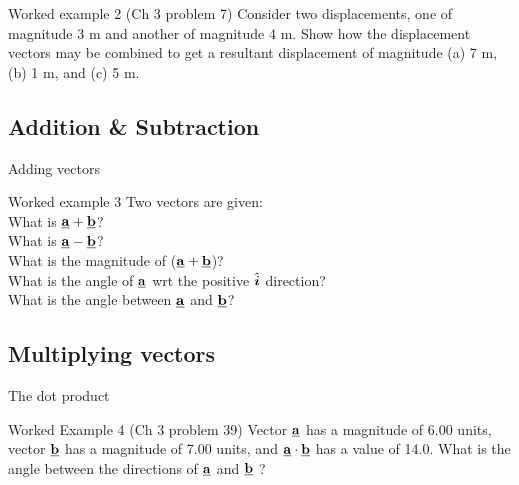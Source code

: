 \begin{frame}{Worked example 2 (Ch 3 problem 7)}
\small
 Consider two displacements, one of magnitude 3 m and another of magnitude 4 m. Show how the displacement vectors may be combined to get a resultant displacement of magnitude (a) 7 m, (b) 1 m, and (c) 5 m.\\[20ex]

\end{frame}



 \subsection{Addition \& Subtraction} %
 
 
\begin{frame}{Adding vectors}
\small

\end{frame}


 \begin{frame}{Worked example 3}
\small
Two vectors are given:\\[2ex]
What is $\underline{\mathbf{a}} + \underline{\mathbf{b}}$? \\[2ex]
What is $\underline{\mathbf{a}} - \underline{\mathbf{b}}$? \\[2ex]
What is the magnitude of ($\underline{\mathbf{a}} + \underline{\mathbf{b}}$)? \\[2ex]
What is the angle of $\underline{\mathbf{a}}$ wrt the positive $\hat{\boldsymbol{i}}$ direction?\\[2ex]
What is the angle between $\underline{\mathbf{a}}$ and $\underline{\mathbf{b}}$?\\[2ex]
\end{frame}

 \subsection{Multiplying vectors} %
 
  \begin{frame}{The dot product}
\small

\end{frame}


  \begin{frame}{Worked Example 4 (Ch 3 problem 39) }
\small
Vector $\underline{\mathbf{a}}$ has a magnitude of 6.00 units, vector $\underline{\mathbf{b}}$ has a magnitude of 7.00 units, and $\underline{\mathbf{a}} \cdot\underline{\mathbf{b}} $ has a value of 14.0. What is the angle between the directions of $\underline{\mathbf{a}}$ and $\underline{\mathbf{b}} $ ?\\[20ex]


\end{frame}

